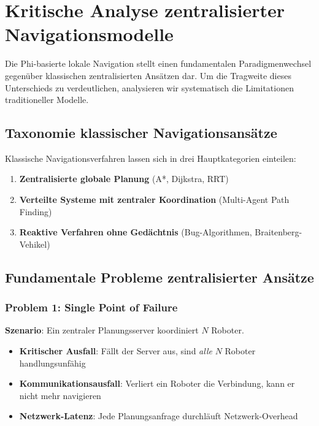 ﻿\documentclass[a4paper,12pt]{article}
\theoremstyle{definition}
\begin{document}
\section{Kritische Analyse zentralisierter Navigationsmodelle}

Die Phi-basierte lokale Navigation stellt einen fundamentalen Paradigmenwechsel gegenüber klassischen zentralisierten Ansätzen dar. Um die Tragweite dieses Unterschieds zu verdeutlichen, analysieren wir systematisch die Limitationen traditioneller Modelle.

\subsection{Taxonomie klassischer Navigationsansätze}

Klassische Navigationsverfahren lassen sich in drei Hauptkategorien einteilen:

\begin{enumerate}
	\item \textbf{Zentralisierte globale Planung} (A*, Dijkstra, RRT)
	\item \textbf{Verteilte Systeme mit zentraler Koordination} (Multi-Agent Path Finding)
	\item \textbf{Reaktive Verfahren ohne Gedächtnis} (Bug-Algorithmen, Braitenberg-Vehikel)
\end{enumerate}

\subsection{Fundamentale Probleme zentralisierter Ansätze}

\subsubsection{Problem 1: Single Point of Failure}

\textbf{Szenario}: Ein zentraler Planungsserver koordiniert $N$ Roboter.

\begin{itemize}
	\item \textbf{Kritischer Ausfall}: Fällt der Server aus, sind \emph{alle} $N$ Roboter handlungsunfähig
	\item \textbf{Kommunikationsausfall}: Verliert ein Roboter die Verbindung, kann er nicht mehr navigieren
	\item \textbf{Netzwerk-Latenz}: Jede Planungsanfrage durchläuft Netzwerk-Overhead
\end{itemize}
\end{document}
